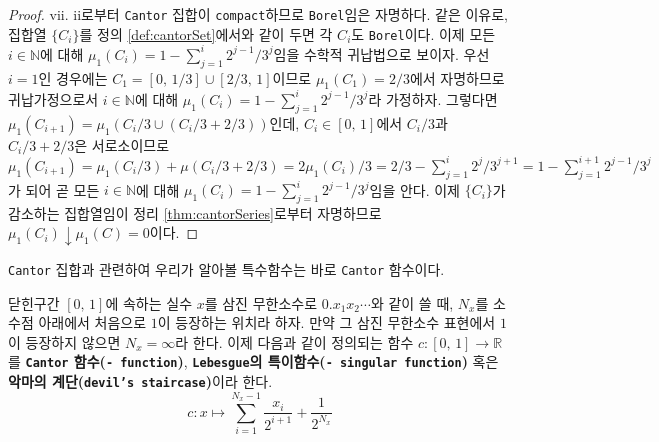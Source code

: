 \begin{proof}
    vii. ii로부터 \texttt{Cantor} 집합이 \texttt{compact}하므로 \texttt{Borel}임은 자명하다. 같은 이유로, 집합열 $\{C_i\}$를 정의 \ref{def:cantorSet}에서와 같이 두면 각 $C_i$도 \texttt{Borel}이다. 이제 모든 $i\in\mathbb{N}$에 대해 $\mu_1(C_i)=1-\sum_{j=1}^i2^{j-1}/3^j$임을 수학적 귀납법으로 보이자. 우선 $i=1$인 경우에는 $C_1=[0,\,1/3]\cup[2/3,\,1]$이므로 $\mu_1(C_1)=2/3$에서 자명하므로 귀납가정으로서 $i\in\mathbb{N}$에 대해 $\mu_1(C_i)=1-\sum_{j=1}^i2^{j-1}/3^j$라 가정하자. 그렇다면 $\mu_1(C_{i+1})=\mu_1(C_i/3\cup(C_i/3+2/3))$인데, $C_i\in[0,\,1]$에서 $C_i/3$과 $C_i/3+2/3$은 서로소이므로 $\mu_1(C_{i+1})=\mu_1(C_i/3)+\mu(C_i/3+2/3)=2\mu_1(C_i)/3=2/3-\sum_{j=1}^i2^j/3^{j+1}=1-\sum_{j=1}^{i+1}2^{j-1}/3^j$가 되어 곧 모든 $i\in\mathbb{N}$에 대해 $\mu_1(C_i)=1-\sum_{j=1}^i2^{j-1}/3^j$임을 안다. 이제 $\{C_i\}$가 감소하는 집합열임이 정리 \ref{thm:cantorSeries}로부터 자명하므로 $\mu_1(C_i)\downarrow\mu_1(C)=0$이다.
\end{proof}

\texttt{Cantor} 집합과 관련하여 우리가 알아볼 특수함수는 바로 \texttt{Cantor} 함수이다.

\begin{definition}
    닫힌구간 $[0,\,1]$에 속하는 실수 $x$를 삼진 무한소수로 $0.x_1x_2\cdots$와 같이 쓸 때, $N_x$를 소수점 아래에서 처음으로 $1$이 등장하는 위치라 하자. 만약 그 삼진 무한소수 표현에서 $1$이 등장하지 않으면 $N_x=\infty$라 한다. 이제 다음과 같이 정의되는 함수 $c:[0,\,1]\to\mathbb{R}$를 \textbf{\texttt{Cantor} 함수(\texttt{- function})}, \textbf{\texttt{Lebesgue}의 특이함수(\texttt{- singular function})} 혹은 \textbf{악마의 계단(\texttt{devil's staircase})}이라 한다.
    \begin{equation*}
        c:x\mapsto\sum_{i=1}^{N_x-1}\frac{x_i}{2^{i+1}}+\frac{1}{2^{N_x}}
    \end{equation*}
\end{definition}

